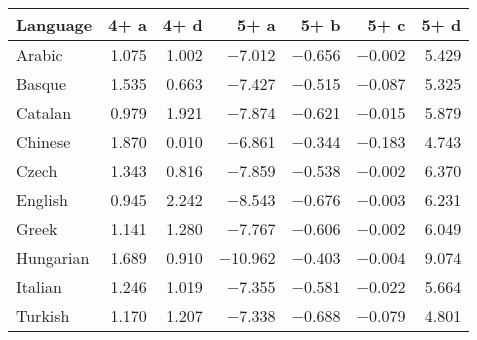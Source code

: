 \begin{tabular}{lrrrrrr}
\toprule
 Language   &   4+ a &   4+ d &    5+ a &   5+ b &   5+ c &   5+ d \\
\midrule
 Arabic     &  \num{1.075} &  \num{1.002} &  \num{-7.012} & \num{-0.656} & \num{-0.002} &  \num{5.429} \\
 Basque     &  \num{1.535} &  \num{0.663} &  \num{-7.427} & \num{-0.515} & \num{-0.087} &  \num{5.325} \\
 Catalan    &  \num{0.979} &  \num{1.921} &  \num{-7.874} & \num{-0.621} & \num{-0.015} &  \num{5.879} \\
 Chinese    &  \num{1.870} &  \num{0.010} &  \num{-6.861} & \num{-0.344} & \num{-0.183} &  \num{4.743} \\
 Czech      &  \num{1.343} &  \num{0.816} &  \num{-7.859} & \num{-0.538} & \num{-0.002} &  \num{6.370} \\
 English    &  \num{0.945} &  \num{2.242} &  \num{-8.543} & \num{-0.676} & \num{-0.003} &  \num{6.231} \\
 Greek      &  \num{1.141} &  \num{1.280} &  \num{-7.767} & \num{-0.606} & \num{-0.002} &  \num{6.049} \\
 Hungarian  &  \num{1.689} &  \num{0.910} & \num{-10.962} & \num{-0.403} & \num{-0.004} &  \num{9.074} \\
 Italian    &  \num{1.246} &  \num{1.019} &  \num{-7.355} & \num{-0.581} & \num{-0.022} &  \num{5.664} \\
 Turkish    &  \num{1.170} &  \num{1.207} &  \num{-7.338} & \num{-0.688} & \num{-0.079} &  \num{4.801} \\
\bottomrule
\end{tabular}